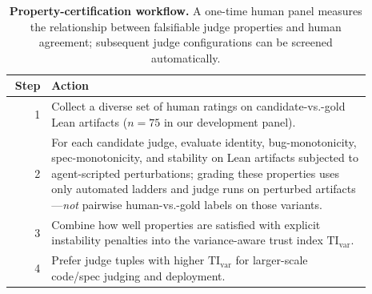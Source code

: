 \documentclass{article}
\begin{document}
\begin{table}[t]
  \centering
  \small
  \begin{tabular}{@{}r@{\kern 7pt}>{\raggedright\arraybackslash} p{0.89\linewidth}@{}}
    \toprule
    \textbf{Step} & \textbf{Action}                                                                                                                                                                                                                                                                                      \\
    \midrule
    1             &
    Collect a diverse set of human ratings on candidate-vs.-gold Lean artifacts (\(n{=}75\) in our development panel).                                                                                                                                                                                                         \\
    2             &
    For each candidate judge, evaluate identity, bug-monotonicity, spec-monotonicity, and stability on Lean artifacts subjected to agent-scripted perturbations; grading these properties uses only automated ladders and judge runs on perturbed artifacts—\emph{not} pairwise human-vs.-gold labels on those variants. \\
    3             &
    Combine how well properties are satisfied with explicit instability penalties into the variance-aware trust index \(\mathrm{TI}_{\mathrm{var}}\).                                                                                                                                                                    \\
    4             &
    Prefer judge tuples with higher \(\mathrm{TI}_{\mathrm{var}}\) for larger-scale code/spec judging and deployment.                                                                                                                                                                                                    \\
    \bottomrule
  \end{tabular}
  \caption{\textbf{Property-certification workflow.}
    A one-time human panel measures the relationship between falsifiable judge properties
    and human agreement; subsequent judge configurations can be screened automatically.}
  \label{tab:protocol_workflow}
\end{table}
\end{document}
